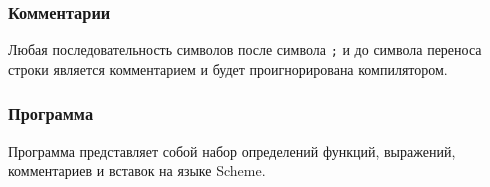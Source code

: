             

        \subsubsection{Комментарии}
            Любая последовательность символов после символа \verb$;$ и до символа переноса строки является комментарием и будет проигнорирована компилятором.

            

        \subsubsection{Программа}
            \label{syntax:program}
            Программа представляет собой набор определений функций, выражений, комментариев и вставок на языке Scheme.

            
